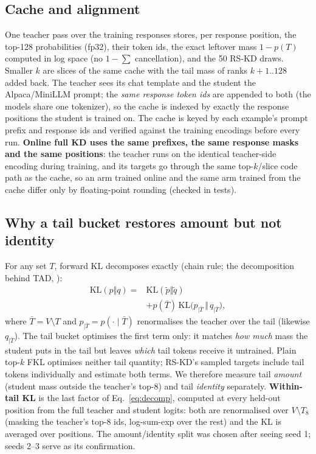 \documentclass[11pt]{article}
\newcommand{\KL}{\mathrm{KL}}
\begin{document}
\subsection{Cache and alignment}\label{sec:cache}
One teacher pass over the training responses stores, per response position, the top-128 probabilities (fp32),
their token ids, the exact leftover mass $1-p(T)$ computed in log space (no $1-\sum$ cancellation), and the 50
RS-KD draws. Smaller $k$ are slices of the same cache with the tail mass of ranks $k{+}1..128$ added back. The
teacher sees its chat template and the student the Alpaca/MiniLLM prompt; the \emph{same response token ids} are
appended to both (the models share one tokenizer), so the cache is indexed by exactly the response positions the
student is trained on. The cache is keyed by each example's prompt prefix and response ids and verified against
the training encodings before every run. \textbf{Online full KD uses the same prefixes, the same response masks
and the same positions}: the teacher runs on the identical teacher-side encoding during training, and its targets
go through the same top-$k$/slice code path as the cache, so an arm trained online and the same arm trained from
the cache differ only by floating-point rounding (checked in tests).

\subsection{Why a tail bucket restores amount but not identity}\label{sec:decomp}
For any set $T$, forward KL decomposes exactly (chain rule; the decomposition behind TAD, \citealp{dasgupta2026tad}):
\begin{equation}
\begin{aligned}
\KL(p\Vert q)={}&\KL(\tilde p\Vert\tilde q)\\
&+p(\bar T)\,\KL\big(p_{\mid\bar T}\,\Vert\,q_{\mid\bar T}\big),
\end{aligned}
\label{eq:decomp}
\end{equation}
where $\bar T=V{\setminus}T$ and $p_{\mid\bar T}=p(\cdot\mid\bar T)$ renormalises the teacher over the tail
(likewise $q_{\mid\bar T}$). The tail bucket optimises the first term
only: it matches \emph{how much} mass the student puts in the tail but leaves \emph{which} tail tokens receive it
untrained. Plain top-$k$ FKL optimises neither tail quantity; RS-KD's sampled targets include tail tokens
individually and estimate both terms. We therefore measure tail \emph{amount} (student mass outside the teacher's
top-8) and tail \emph{identity} separately. \textbf{Within-tail KL} is the last factor of Eq.~\ref{eq:decomp},
computed at every held-out position from the full teacher and student logits: both are renormalised over
$V{\setminus}T_8$ (masking the teacher's top-8 ids, log-sum-exp over the rest) and the KL is averaged over
positions. The amount/identity split was chosen after seeing seed 1; seeds 2--3 serve as its confirmation.
\end{document}
